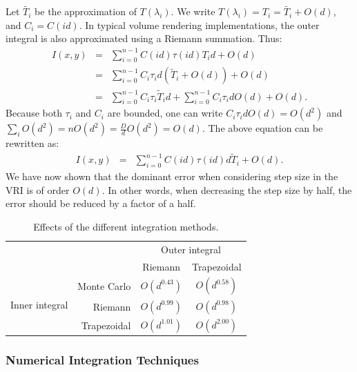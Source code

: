 Let $\tilde{T_i}$ be the approximation of $T(\lambda_i)$. We write
$T(\lambda_i) = T_i = \tilde{T_i} + O(d)$, and $C_i = C(id)$.  
%
In typical volume rendering implementations, the outer integral is
also approximated using a Riemann summation. Thus:
\begin{eqnarray}
I(x,y) &=& \sum_{i=0} ^ {n-1} C(i d) \tau(i d) T_i d + O(d)\\
&=& \sum_{i=0}^{n-1} C_i \tau_i d \left(\tilde{T}_{i} + O(d)\right) + O(d)\\
&=& \sum_{i=0}^{n-1} C_i \tau_i \tilde{T}_{i} d + \sum_{i=0}^{n-1} C_i \tau_i d O(d) + O(d).
\end{eqnarray}
Because both $\tau_i$ and $C_i$ are bounded, one can write $C_i \tau_i d O(d) = O(d^2)$ and $\sum_i O(d^2) = n O(d^2) = \frac{D}{d}O(d^2) = O(d)$. The above equation can be rewritten as:
\begin{eqnarray}
I(x,y)  &=& \sum_{i=0} ^ {n-1} C(i d) \tau(i d) d \tilde{T}_{i} + O(d).
\end{eqnarray}
We have now shown that the dominant error when considering step size
in the VRI is of order $O(d)$. In other words, when decreasing the step size by half, the
error should be reduced by a factor of a half.


\begin{table}[t]
\normalsize
  \caption{Effects of the different integration methods.}
  \centering
  \begin{tabular}{c  r | c c }
  & & \multicolumn{2}{c}{Outer integral}\\
   &                & Riemann & Trapezoidal \\
    \hline
\multirow{3}{*}{\parbox{1cm}{Inner \mbox{integral}}} & Monte Carlo & $ O(d^{0.43}) $ & $ O(d^{0.58})$ \\
& Riemann      & $ O(d^{0.99}) $ & $ O(d^{0.98}) $ \\
&Trapezoidal     & $ O(d^{1.01}) $ & $ O(d^{2.00})$ \\
    \hline  
  \end{tabular} 
  \label{table:orders} 
\end{table}

\subsubsection{Numerical Integration Techniques}

